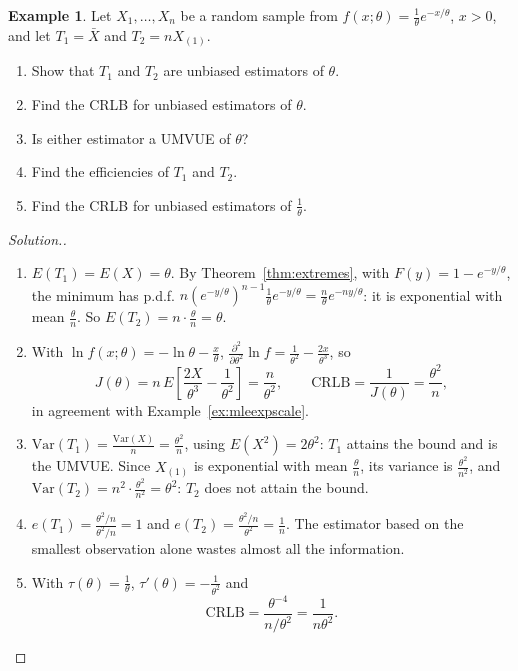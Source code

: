 \documentclass[12pt,a4paper]{report}
\theoremstyle{definition}
\newtheorem{example}[thm]{Example}
\theoremstyle{plain}
\newenvironment{solution}
  {\renewcommand{\qedsymbol}{}\begin{proof}[\textit{Solution}.]}
  {\end{proof}}
\begin{document}
\begin{example}
\label{ex:crlbexp}
Let $X_1, \dots, X_n$ be a random sample from
$f(x;\theta) = \frac{1}{\theta}e^{-x/\theta}$, $x > 0$, and let $T_1 = \bar{X}$
and $T_2 = nX_{(1)}$.
\begin{enumerate}
\item[(a)] Show that $T_1$ and $T_2$ are unbiased estimators of $\theta$.
\item[(b)] Find the CRLB for unbiased estimators of $\theta$.
\item[(c)] Is either estimator a UMVUE of $\theta$?
\item[(d)] Find the efficiencies of $T_1$ and $T_2$.
\item[(e)] Find the CRLB for unbiased estimators of $\frac{1}{\theta}$.
\end{enumerate}
\end{example}

\begin{solution}
\begin{enumerate}
\item[(a)] $E(T_1) = E(X) = \theta$. By Theorem~\ref{thm:extremes}, with
$F(y) = 1 - e^{-y/\theta}$, the minimum has p.d.f.
$n\left(e^{-y/\theta}\right)^{n-1}\frac1\theta e^{-y/\theta} =
\frac{n}{\theta}e^{-ny/\theta}$: it is exponential with mean $\frac{\theta}{n}$.
So $E(T_2) = n\cdot\frac{\theta}{n} = \theta$.

\item[(b)] With $\ln f(x;\theta) = -\ln\theta - \frac{x}{\theta}$,
$\frac{\partial^2}{\partial\theta^2}\ln f = \frac{1}{\theta^2} -
\frac{2x}{\theta^3}$, so
\[J(\theta) = n\,E\left[\frac{2X}{\theta^3} - \frac{1}{\theta^2}\right] =
\frac{n}{\theta^2},\qquad \text{CRLB} = \frac{1}{J(\theta)} = \frac{\theta^2}{n},\]
in agreement with Example~\ref{ex:mleexpscale}.

\item[(c)] $\text{Var}(T_1) = \frac{\text{Var}(X)}{n} = \frac{\theta^2}{n}$,
using $E(X^2) = 2\theta^2$: $T_1$ attains the bound and is the UMVUE. Since
$X_{(1)}$ is exponential with mean $\frac\theta n$, its variance is
$\frac{\theta^2}{n^2}$, and $\text{Var}(T_2) = n^2\cdot\frac{\theta^2}{n^2} =
\theta^2$: $T_2$ does not attain the bound.

\item[(d)] $e(T_1) = \frac{\theta^2/n}{\theta^2/n} = 1$ and
$e(T_2) = \frac{\theta^2/n}{\theta^2} = \frac{1}{n}$. The estimator based on the
smallest observation alone wastes almost all the information.

\item[(e)] With $\tau(\theta) = \frac1\theta$, $\tau'(\theta) = -\frac{1}{\theta^2}$
and
\[\text{CRLB} = \frac{\theta^{-4}}{n/\theta^2} = \frac{1}{n\theta^2} .\]
\end{enumerate}
\end{solution}
\end{document}
